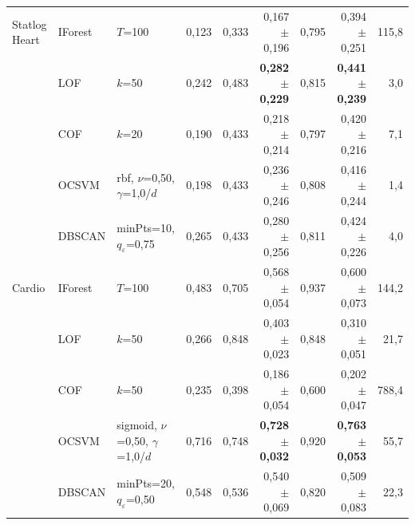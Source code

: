 \begin{tabular}{llL{3.2cm}rrrrrr}
Statlog Heart & IForest & $T$=100 & 0,123 & 0,333 & 0,167 $\pm$ 0,196 & 0,795 & 0,394 $\pm$ 0,251 & 115,8 \\
 & LOF & $k$=50 & 0,242 & 0,483 & \textbf{0,282 $\pm$ 0,229} & 0,815 & \textbf{0,441 $\pm$ 0,239} & 3,0 \\
 & COF & $k$=20 & 0,190 & 0,433 & 0,218 $\pm$ 0,214 & 0,797 & 0,420 $\pm$ 0,216 & 7,1 \\
 & OCSVM & rbf, $\nu$=0,50, $\gamma$=1,0/$d$ & 0,198 & 0,433 & 0,236 $\pm$ 0,246 & 0,808 & 0,416 $\pm$ 0,244 & 1,4 \\
 & DBSCAN & minPts=10, $q_\varepsilon$=0,75 & 0,265 & 0,433 & 0,280 $\pm$ 0,256 & 0,811 & 0,424 $\pm$ 0,226 & 4,0 \\
\midrule
Cardio & IForest & $T$=100 & 0,483 & 0,705 & 0,568 $\pm$ 0,054 & 0,937 & 0,600 $\pm$ 0,073 & 144,2 \\
 & LOF & $k$=50 & 0,266 & 0,848 & 0,403 $\pm$ 0,023 & 0,848 & 0,310 $\pm$ 0,051 & 21,7 \\
 & COF & $k$=50 & 0,235 & 0,398 & 0,186 $\pm$ 0,054 & 0,600 & 0,202 $\pm$ 0,047 & 788,4 \\
 & OCSVM & sigmoid, $\nu$=0,50, $\gamma$=1,0/$d$ & 0,716 & 0,748 & \textbf{0,728 $\pm$ 0,032} & 0,920 & \textbf{0,763 $\pm$ 0,053} & 55,7 \\
 & DBSCAN & minPts=20, $q_\varepsilon$=0,50 & 0,548 & 0,536 & 0,540 $\pm$ 0,069 & 0,820 & 0,509 $\pm$ 0,083 & 22,3 \\
\bottomrule
\end{tabular}
